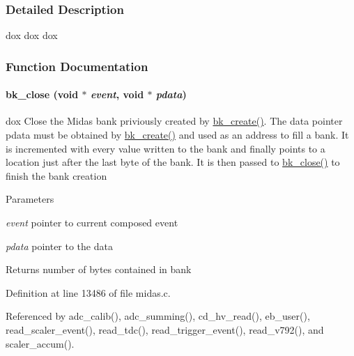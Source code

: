 \subsubsection{Detailed Description}
dox dox dox 

\subsubsection{Function Documentation}
\paragraph[{bk\_\-close}]{ bk\_\-close (void $\ast$ {\em event}, \/  void $\ast$ {\em pdata})}\hfill\label{group__bkfunctionc_ga132dc71c8f74b478cdcc59bc1d9f6a26}
dox Close the Midas bank priviously created by \hyperlink{group__bkfunctionc_ga4bb781187e18834136ed8ac368d53413}{bk\_\-create()}. The data pointer pdata must be obtained by \hyperlink{group__bkfunctionc_ga4bb781187e18834136ed8ac368d53413}{bk\_\-create()} and used as an address to fill a bank. It is incremented with every value written to the bank and finally points to a location just after the last byte of the bank. It is then passed to \hyperlink{group__bkfunctionc_ga132dc71c8f74b478cdcc59bc1d9f6a26}{bk\_\-close()} to finish the bank creation 
\begin{DoxyParams}{Parameters}
\item[{\em event}]pointer to current composed event \item[{\em pdata}]pointer to the data \end{DoxyParams}
\begin{DoxyReturn}{Returns}
number of bytes contained in bank 
\end{DoxyReturn}


Definition at line 13486 of file midas.c.

Referenced by adc\_\-calib(), adc\_\-summing(), cd\_\-hv\_\-read(), eb\_\-user(), read\_\-scaler\_\-event(), read\_\-tdc(), read\_\-trigger\_\-event(), read\_\-v792(), and scaler\_\-accum().
